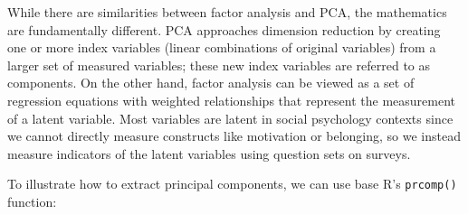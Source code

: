 \documentclass[
]{book}
\newenvironment{Shaded}{\begin{snugshade}}{\end{snugshade}}
\newcommand{\AttributeTok}[1]{\textcolor[rgb]{0.77,0.63,0.00}{#1}}
\newcommand{\CommentTok}[1]{\textcolor[rgb]{0.56,0.35,0.01}{\textit{#1}}}
\newcommand{\ConstantTok}[1]{\textcolor[rgb]{0.00,0.00,0.00}{#1}}
\newcommand{\DecValTok}[1]{\textcolor[rgb]{0.00,0.00,0.81}{#1}}
\newcommand{\FunctionTok}[1]{\textcolor[rgb]{0.00,0.00,0.00}{#1}}
\newcommand{\NormalTok}[1]{#1}
\newcommand{\OtherTok}[1]{\textcolor[rgb]{0.56,0.35,0.01}{#1}}
\newcommand{\SpecialCharTok}[1]{\textcolor[rgb]{0.00,0.00,0.00}{#1}}
\newcommand{\StringTok}[1]{\textcolor[rgb]{0.31,0.60,0.02}{#1}}
\begin{document}
While there are similarities between factor analysis and PCA, the mathematics are fundamentally different. PCA approaches dimension reduction by creating one or more index variables (linear combinations of original variables) from a larger set of measured variables; these new index variables are referred to as components. On the other hand, factor analysis can be viewed as a set of regression equations with weighted relationships that represent the measurement of a latent variable. Most variables are latent in social psychology contexts since we cannot directly measure constructs like motivation or belonging, so we instead measure indicators of the latent variables using question sets on surveys.

To illustrate how to extract principal components, we can use base R's \texttt{prcomp()} function:

\begin{Shaded}
\end{Shaded}
\end{document}
